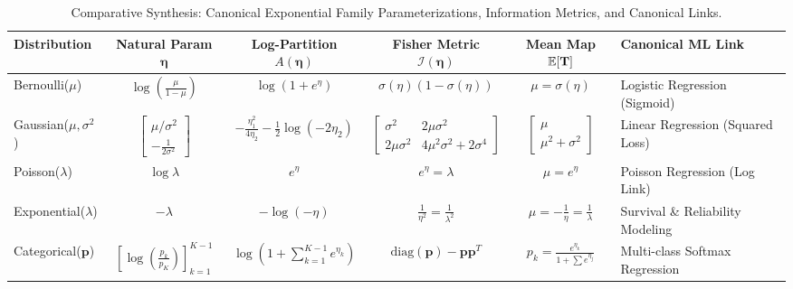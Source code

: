 \begin{table}[htbp]
\centering
\scriptsize
\setlength{\tabcolsep}{2.5pt}
\begin{tabularx}{\textwidth}{lcccc>{\raggedright\arraybackslash}X}
\toprule
\textbf{Distribution} & \textbf{Natural Param $\boldsymbol{\eta}$} & \textbf{Log-Partition $A(\boldsymbol{\eta})$} & \textbf{Fisher Metric $\mathcal{I}(\boldsymbol{\eta})$} & \textbf{Mean Map $\operatorname{\mathbb{E}}[\mathbf{T}]$} & \textbf{Canonical ML Link} \\
\midrule
Bernoulli($\mu$) & $\log\left(\frac{\mu}{1 - \mu}\right)$ & $\log(1 + e^\eta)$ & $\sigma(\eta)(1 - \sigma(\eta))$ & $\mu = \sigma(\eta)$ & Logistic Regression (Sigmoid) \\
\addlinespace
Gaussian($\mu, \sigma^2$) & $\begin{bmatrix} \mu/\sigma^2 \\ -\frac{1}{2\sigma^2} \end{bmatrix}$ & $-\frac{\eta_1^2}{4\eta_2} - \frac{1}{2}\log(-2\eta_2)$ & $\begin{bmatrix} \sigma^2 & 2\mu\sigma^2 \\ 2\mu\sigma^2 & 4\mu^2\sigma^2 + 2\sigma^4 \end{bmatrix}$ & $\begin{bmatrix} \mu \\ \mu^2 + \sigma^2 \end{bmatrix}$ & Linear Regression (Squared Loss) \\
\addlinespace
Poisson($\lambda$) & $\log\lambda$ & $e^\eta$ & $e^\eta = \lambda$ & $\mu = e^\eta$ & Poisson Regression (Log Link) \\
\addlinespace
Exponential($\lambda$) & $-\lambda$ & $-\log(-\eta)$ & $\frac{1}{\eta^2} = \frac{1}{\lambda^2}$ & $\mu = -\frac{1}{\eta} = \frac{1}{\lambda}$ & Survival \& Reliability Modeling \\
\addlinespace
Categorical($\mathbf{p}$) & $\left[\log\left(\frac{p_k}{p_K}\right)\right]_{k=1}^{K-1}$ & $\log\left(1 + \sum_{k=1}^{K-1} e^{\eta_k}\right)$ & $\text{diag}(\mathbf{p}) - \mathbf{p}\mathbf{p}^T$ & $p_k = \frac{e^{\eta_k}}{1 + \sum e^{\eta_j}}$ & Multi-class Softmax Regression \\
\bottomrule
\end{tabularx}
\caption{Comparative Synthesis: Canonical Exponential Family Parameterizations, Information Metrics, and Canonical Links.}
\label{tab:exp_family_summary}
\end{table}

